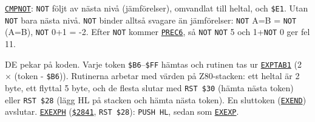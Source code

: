 \begin{Listing}
\Gap
\begin{Cmt}\par\noindent \hyperlink{l:CMPNOT}{\texttt{CMPNOT}}: {}\texttt{NOT}{} följt av nästa nivå (jämförelser), omvandlat till heltal, och \texttt{\$E1}. Utan \texttt{NOT} bara nästa nivå. \texttt{NOT} binder alltså svagare än jämförelser: \texttt{NOT} A=B = \texttt{NOT} (A=B), \texttt{NOT} 0+1 = \mbox{-}2. Efter \texttt{NOT} kommer \hyperlink{l:PREC6}{\texttt{PREC6}}, så \texttt{NOT} \texttt{NOT} 5 och 1+\texttt{NOT} 0 ger fel 11.\par\end{Cmt}
\Gap
{}
\begin{Note}\par\noindent DE pekar på koden. Varje token \texttt{\$B6}–\texttt{\$FF} hämtas och rutinen tas ur \hyperlink{l:EXPTAB1}{\texttt{EXPTAB1}} (2 × (token - \texttt{\$B6})). Rutinerna arbetar med värden på Z80-stacken: ett heltal är 2 byte, ett flyttal 5 byte, och de flesta slutar med \texttt{RST \$30} (hämta nästa token) eller \texttt{RST \$28} (lägg HL på stacken och hämta nästa token). En sluttoken (\hyperlink{l:EXEND}{\texttt{EXEND}}) avslutar. \hyperlink{l:EXEXPH}{\texttt{EXEXPH}} (\hyperlink{a:2841}{\texttt{\$2841}}, \texttt{RST \$28}): \texttt{PUSH HL}, sedan som \hyperlink{l:EXEXP}{\texttt{EXEXP}}.\par\end{Note}

\end{Listing}
